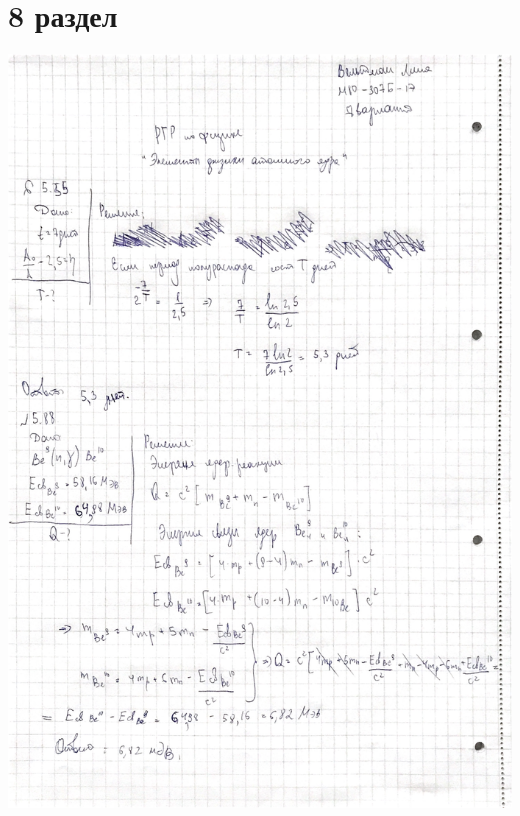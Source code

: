 \documentclass[12pt]{article}
\begin{document}
\section{8 раздел}
\begin{center}
\includegraphics[scale=0.2]{8_1.jpeg}\\
\vfill

\end{center}
\end{document}
